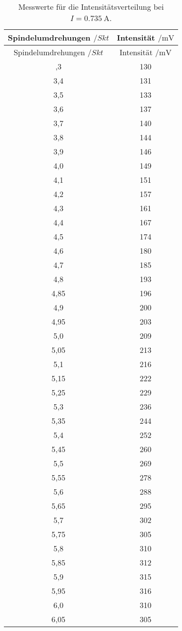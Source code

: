 \begin{longtable}{cc}
  \caption{Messwerte für die Intensitätsverteilung bei $I=\SI{0.735}{\ampere}$.}\\
  \hline
  \toprule
  Spindelumdrehungen $/Skt$ & Intensität $/\si{\milli\volt}$ \\
  \midrule
\endfirsthead
\toprule
Spindelumdrehungen $/Skt$ & Intensität $/\si{\milli\volt}$ \\
\midrule
\endhead
\bottomrule
\endfoot
\bottomrule
\bottomrule
\endlastfoot
3,3  & 130\\
3,4  & 131\\
3,5  & 133\\
3,6  & 137\\
3,7  & 140\\
3,8  & 144\\
3,9  & 146\\
4,0  & 149\\
4,1  & 151\\
4,2  & 157\\
4,3  & 161\\
4,4  & 167\\
4,5  & 174\\
4,6  & 180\\
4,7  & 185\\
4,8  & 193\\
4,85 & 196\\
4,9  & 200\\
4,95 & 203\\
5,0  & 209\\
5,05 & 213\\
5,1  & 216\\
5,15 & 222\\
5,25 & 229\\
5,3  & 236\\
5,35 & 244\\
5,4  & 252\\
5,45 & 260\\
5,5  & 269\\
5,55 & 278\\
5,6  & 288\\
5,65 & 295\\
5,7  & 302\\
5,75 & 305\\
5,8  & 310\\
5,85 & 312\\
5,9  & 315\\
5,95 & 316\\
6,0  & 310\\
6,05 & 305\\

\end{longtable}
